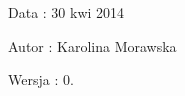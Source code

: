 \begin{DoxyDate}{Data}
\-: 30 kwi 2014 
\end{DoxyDate}
\begin{DoxyAuthor}{Autor}
\-: Karolina Morawska 
\end{DoxyAuthor}
\begin{DoxyVersion}{Wersja}
\-: 0. 
\end{DoxyVersion}
